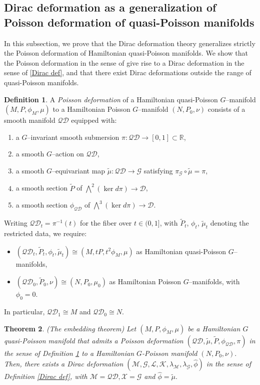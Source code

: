 \documentclass[reqno]{amsart}
\theoremstyle{plain}
\newtheorem{Thm}{Theorem}[section]
\theoremstyle{definition}
\newtheorem{Def}[Thm]{Definition}
\newcommand{\QD}{\mathcal{QD}}
\newcommand{\R}{\mathbb{R}}
\newcommand{\G}{\mathcal{G}}
\newcommand{\M}{\mathcal{M}}
\renewcommand{\L}{\mathcal{L}}
\newcommand{\X}{\mathcal{X}}
\newcommand{\K}{\mathcal{K}}
\begin{document}
\subsection{Dirac deformation as a generalization of Poisson deformation of quasi-Poisson manifolds} In this subsection, we prove that the Dirac deformation theory generalizes strictly the Poisson deformation of Hamiltonian quasi-Poisson manifolds. We show that the Poisson deformation in the sense of \cite[]{maiza2026multiplicative} give rise to a Dirac deformation in the sense of \ref{Dirac def}, and that there exist Dirac deformations outside the range of quasi-Poisson manifolds.

\begin{Def}\cite[Definition 2.1]{maiza2026multiplicative} \label{Poisson def}
A \emph{Poisson deformation} of a Hamiltonian quasi-Poisson $G$--manifold $(M,P,\phi_{M},\mu)$ to a Hamiltonian Poisson $G$--manifold $(N,P_{0},\nu)$ consists of a smooth manifold $\mathcal{QD}$ equipped with:
\begin{enumerate}
\item a $G$--invariant smooth submersion $\pi:\mathcal{QD}\to[0,1]\subset \R$,
\item a smooth $G$--action on $\mathcal{QD}$,
\item a smooth $G$--equivariant map $\tilde{\mu}:\mathcal{QD}\to\mathcal{G}$ satisfying $\pi_{\mathcal{G}}\circ\tilde{\mu}=\pi$,
\item a smooth section $\tilde{P}$ of $\bigwedge^{2}(\ker d\pi)\to\mathcal{D}$,
\item a smooth section $\phi_{\mathcal{QD}}$ of $\bigwedge^{3}(\ker d\pi)\to\mathcal{D}$.
\end{enumerate}
Writing $\mathcal{QD}_{t}=\pi^{-1}(t)$ for the fiber over $t\in(0,1]$, with $\tilde{P}_{t}$, $\phi_{t}$, $\tilde{\mu}_{t}$ denoting the restricted data, we require:
\begin{itemize}
\item $(\mathcal{QD}_{t},\tilde{P}_{t},\phi_{t},\tilde{\mu}_{t})\cong (M,tP,t^{2}\phi_{M},\mu)$ as Hamiltonian quasi-Poisson $G$--manifolds,
\item $(\mathcal{QD}_{0},\tilde{P}_{0},\nu)\cong (N,P_{0},\mu_{0})$ as Hamiltonian Poisson $G$--manifolds, with $\phi_{0}=0$.
\end{itemize}
In particular, $\mathcal{QD}_{1}\cong M$ and $\mathcal{QD}_{0}\cong N$.
\end{Def}

\begin{Thm}(The embedding theorem) \label{embed thm}
Let $(M,P,\phi_M,\mu)$ be a Hamiltonian $G$ quasi-Poisson manifold that admits a Poisson deformation $(\QD,\tilde{\mu},\tilde{P},\phi_{\QD},\pi)$ in the sense of Definition \ref{Poisson def} to a Hamiltonian $G$-Poisson manifold $(N,P_0,\nu).$ Then, there exists a Dirac deformation $(\M,\G,\L,\K,\lambda_{\M},\lambda_{\G}, \widehat{\phi})$ in the sense of Definition \ref{Dirac def}, with $\M = \QD, \X = \G$ and $\widehat{\phi} = \tilde{\mu}.$
\end{Thm}
\end{document}
